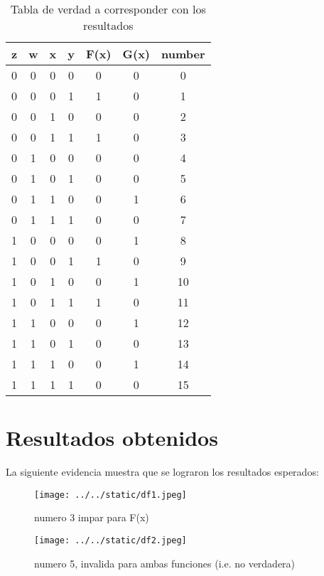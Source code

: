 \documentclass{article}
\begin{document}
\begin{multicols}{2}
\begin{table}[H]
	\centering
	\begin{tabular}{|c|c|c|c|c|c|c|}
		\hline
		z & w & x & y & F(x) & G(x) &number\\
		\hline
		0 & 0 & 0 & 0 & 0 & 0 & 0 \\
		\hline
		0 & 0 & 0 & 1 & 1 & 0 & 1 \\
		\hline
		0 & 0 & 1 & 0 & 0 & 0 & 2 \\
		\hline
		0 & 0 & 1 & 1 & 1 & 0 & 3 \\
		\hline
		0 & 1 & 0 & 0 & 0 & 0 & 4 \\ 
		\hline
		0 & 1 & 0 & 1 & 0 & 0 & 5 \\ %
		\hline
	  0 & 1 & 1 & 0 & 0 & 1 &6 \\
		\hline
		0 & 1 & 1 & 1 & 0 & 0 & 7 \\
		\hline
		1 & 0 & 0 & 0 & 0 & 1 & 8 \\
		\hline
		1 & 0 & 0 & 1 & 1 & 0 & 9 \\
		\hline
		1 & 0 & 1 & 0 & 0 & 1 & 10 \\
		\hline
		1 & 0 & 1 & 1 & 1 & 0 & 11 \\
		\hline
		1 & 1 & 0 & 0 & 0 & 1 & 12 \\ 
		\hline
		1 & 1 & 0 & 1 & 0 & 0 & 13 \\
		\hline
	  1 & 1 & 1 & 0 & 0 & 1 & 14 \\
		\hline
		1 & 1 & 1 & 1 & 0 & 0 & 15 \\
		\hline
	\end{tabular}
	\caption{Tabla de verdad a corresponder con los resultados}
	\label{tab:1}
\end{table}
\section{Resultados obtenidos}\label{sec:resObtenidos}
La siguiente evidencia muestra que se lograron los resultados esperados:

\begin{figure}[H]
	\centering	
	\texttt{[image: ../../static/df1.jpeg]}
	\caption{numero 3 impar para F(x)}
	\label{fig:1}
\end{figure}

\begin{figure}[H]
	\centering	
	\texttt{[image: ../../static/df2.jpeg]}
	\caption{numero 5, invalida para ambas funciones (i.e. no verdadera)}
	\label{fig:2}
\end{figure}


\end{multicols}
\end{document}
